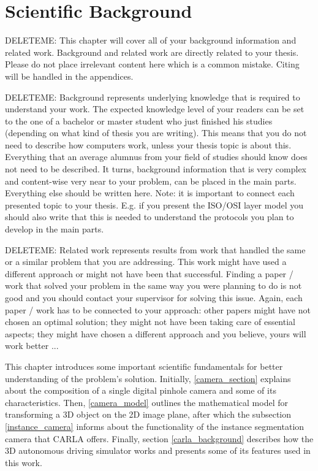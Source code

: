 \chapter{Scientific Background}
\label{background}

DELETEME: This chapter will cover all of your background information and related work. Background and related work are directly related to your thesis. Please do not place irrelevant content here which is a common mistake. Citing will be handled in the appendices.

DELETEME: Background represents underlying knowledge that is required to understand your work. The expected knowledge level of your readers can be set to the one of a bachelor or master student who just finished his studies (depending on what kind of thesis you are writing). This means that you do not need to describe how computers work, unless your thesis topic is about this. Everything that an average alumnus from your field of studies should know does not need to be described. It turns, background information that is very complex and content-wise very near to your problem, can be placed in the main parts. Everything else should be written here. Note: it is important to connect each presented topic to your thesis. E.g. if you present the ISO/OSI layer model you should also write that this is needed to understand the protocols you plan to develop in the main parts.

DELETEME: Related work represents results from work that handled the same or a similar problem that you are addressing. This work might have used a different approach or might not have been that successful. Finding a paper / work that solved your problem in the same way you were planning to do is not good and you should contact your supervisor for solving this issue. Again, each paper / work has to be connected to your approach: other papers might have not chosen an optimal solution; they might not have been taking care of essential aspects; they might have chosen a different approach and you believe, yours will work better ...

This chapter introduces some important scientific fundamentals for better understanding of the problem's solution. Initially, \ref{camera_section} explains about the composition of a single digital pinhole camera and some of its characteristics. Then, \ref{camera_model} outlines the mathematical model for transforming a 3D object on the 2D image plane, after which the subsection \ref{instance_camera} informs about the functionality of the instance segmentation camera that CARLA offers. Finally, section \ref{carla_background} describes how the 3D autonomous driving simulator works and presents some of its features used in this work.

